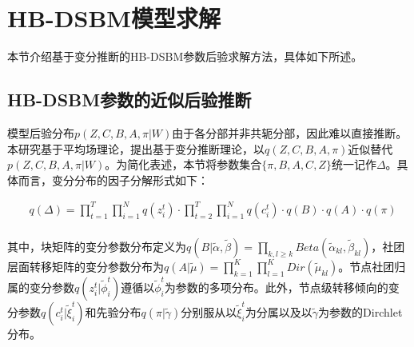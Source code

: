 \section{HB-DSBM模型求解}
本节介绍基于变分推断的HB-DSBM参数后验求解方法，具体如下所述。

\subsection{HB-DSBM参数的近似后验推断}

模型后验分布$p(Z, C, B, A, \pi | W)$由于各分部并非共轭分部，因此难以直接推断。本研究基于平均场理论，提出基于变分推断理论，以$q(Z, C, B, A, \pi)$近似替代$p(Z, C, B, A, \pi | W)$。为简化表述，本节将参数集合$\{\pi, B, A, C, Z\}$统一记作$\Delta$。具体而言，变分分布的因子分解形式如下：

\begin{equation}
\label{eq2}
\begin{split}
& q(\Delta) = \prod_{t=1}^T \prod_{i=1}^N q(z_i^t) \cdot \prod_{t=2}^T \prod_{i=1}^N q(c_i^t) \cdot q(B) \cdot q(A) \cdot q(\pi) \\
\end{split}
\end{equation}

其中，块矩阵的变分参数分布定义为$q(B | \widetilde{\alpha}, \widetilde{\beta}) = \prod_{k,l \geq k} Beta(\widetilde{\alpha}_{kl}, \widetilde{\beta}_{kl})$，社团层面转移矩阵的变分参数分布为$q(A | \widetilde{\mu}) = \prod_{k=1}^K \prod_{l=1}^K Dir(\widetilde{\mu}_{kl})$。节点社团归属的变分参数$q(z_i^t | \widetilde{\phi}_i^t)$遵循以$\widetilde{\phi}_i^t$为参数的多项分布。此外，节点级转移倾向的变分参数$q(c_i^t | \widetilde{\xi}_i^t)$和先验分布$q(\pi | \widetilde{\gamma})$分别服从以$\widetilde{\xi}_i^t$为分属以及以$\widetilde{\gamma}$为参数的Dirchlet分布。




